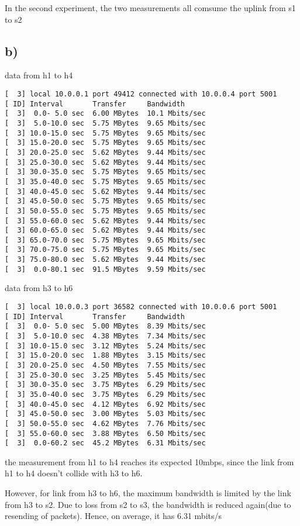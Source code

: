 \documentclass[11pt]{article}
\begin{document}
In the second experiment, the two measurements all comsume the uplink from s1 to s2
\subsection{b)}
\label{sec:org94cef85}
data from h1 to h4
\begin{verbatim}
[  3] local 10.0.0.1 port 49412 connected with 10.0.0.4 port 5001
[ ID] Interval       Transfer     Bandwidth
[  3]  0.0- 5.0 sec  6.00 MBytes  10.1 Mbits/sec
[  3]  5.0-10.0 sec  5.75 MBytes  9.65 Mbits/sec
[  3] 10.0-15.0 sec  5.75 MBytes  9.65 Mbits/sec
[  3] 15.0-20.0 sec  5.75 MBytes  9.65 Mbits/sec
[  3] 20.0-25.0 sec  5.62 MBytes  9.44 Mbits/sec
[  3] 25.0-30.0 sec  5.62 MBytes  9.44 Mbits/sec
[  3] 30.0-35.0 sec  5.75 MBytes  9.65 Mbits/sec
[  3] 35.0-40.0 sec  5.75 MBytes  9.65 Mbits/sec
[  3] 40.0-45.0 sec  5.62 MBytes  9.44 Mbits/sec
[  3] 45.0-50.0 sec  5.75 MBytes  9.65 Mbits/sec
[  3] 50.0-55.0 sec  5.75 MBytes  9.65 Mbits/sec
[  3] 55.0-60.0 sec  5.62 MBytes  9.44 Mbits/sec
[  3] 60.0-65.0 sec  5.62 MBytes  9.44 Mbits/sec
[  3] 65.0-70.0 sec  5.75 MBytes  9.65 Mbits/sec
[  3] 70.0-75.0 sec  5.75 MBytes  9.65 Mbits/sec
[  3] 75.0-80.0 sec  5.62 MBytes  9.44 Mbits/sec
[  3]  0.0-80.1 sec  91.5 MBytes  9.59 Mbits/sec
\end{verbatim}
data from h3 to h6
\begin{verbatim}
[  3] local 10.0.0.3 port 36582 connected with 10.0.0.6 port 5001
[ ID] Interval       Transfer     Bandwidth
[  3]  0.0- 5.0 sec  5.00 MBytes  8.39 Mbits/sec
[  3]  5.0-10.0 sec  4.38 MBytes  7.34 Mbits/sec
[  3] 10.0-15.0 sec  3.12 MBytes  5.24 Mbits/sec
[  3] 15.0-20.0 sec  1.88 MBytes  3.15 Mbits/sec
[  3] 20.0-25.0 sec  4.50 MBytes  7.55 Mbits/sec
[  3] 25.0-30.0 sec  3.25 MBytes  5.45 Mbits/sec
[  3] 30.0-35.0 sec  3.75 MBytes  6.29 Mbits/sec
[  3] 35.0-40.0 sec  3.75 MBytes  6.29 Mbits/sec
[  3] 40.0-45.0 sec  4.12 MBytes  6.92 Mbits/sec
[  3] 45.0-50.0 sec  3.00 MBytes  5.03 Mbits/sec
[  3] 50.0-55.0 sec  4.62 MBytes  7.76 Mbits/sec
[  3] 55.0-60.0 sec  3.88 MBytes  6.50 Mbits/sec
[  3]  0.0-60.2 sec  45.2 MBytes  6.31 Mbits/sec
\end{verbatim}

the measurement from h1 to h4 reaches its expected 10mbps, since the link from h1 to
h4 doesn't collide with h3 to h6.

However, for link from h3 to h6, the maximum bandwidth is limited by the link from
h3 to s2. Due to loss from s2 to s3, the bandwidth is reduced again(due to resending
of packets). Hence, on average, it has 6.31 mbits/s
\end{document}
